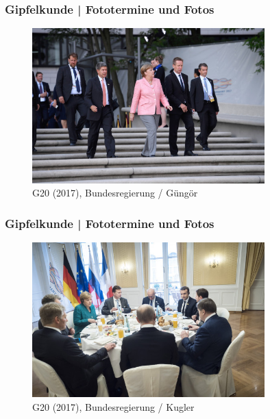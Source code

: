 \documentclass[]{beamer}
\begin{document}
	\begin{frame}
	\frametitle{Gipfelkunde | Fototermine und Fotos}
	\begin{figure}[h!]
		\renewcommand{\figurename}{Foto} 
		\includegraphics[width=0.8\textwidth]{images/fotos_05_BundesregierungGuengoer}
		\caption{G20 (2017), Bundesregierung / Güngör}
	\end{figure}
	\end{frame}

	\begin{frame}
	\frametitle{Gipfelkunde | Fototermine und Fotos}
	\begin{figure}[h!]
		\renewcommand{\figurename}{Foto} 
		\includegraphics[width=0.8\textwidth]{images/fotos_06_BundesregierungKugler}
		\caption{G20 (2017), Bundesregierung / Kugler}
	\end{figure}
	\end{frame}
\end{document}
